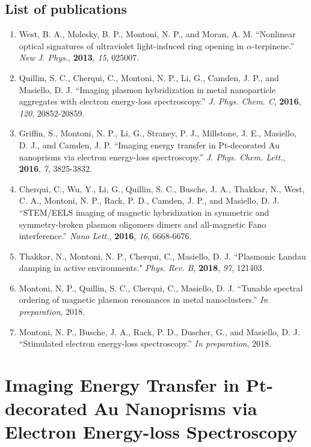 \documentclass [11pt, proquest] {uwthesis}[2016/11/22]
\begin{document}
\section{List of publications}
\begin{enumerate}
\item West, B. A., Molesky, B. P., Montoni, N. P., and Moran, A. M. ``Nonlinear optical signatures of ultraviolet light-induced ring opening in $\alpha$-terpinene.'' {\it New J. Phys.}, {\bf 2013}, {\it 15}, 025007.
\item Quillin, S. C., Cherqui, C., Montoni, N. P., Li, G., Camden, J. P., and Masiello, D. J. ``Imaging plasmon hybridization in metal nanoparticle aggregates with electron energy-loss spectroscopy.'' {\it J. Phys. Chem. C}, {\bf 2016}, {\it 120}, 20852-20859.
\item Griffin, S., Montoni, N. P., Li, G., Straney, P. J., Millstone, J. E., Masiello, D. J., and Camden, J. P. ``Imaging energy transfer in Pt-decorated Au nanoprisms via electron energy-loss spectroscopy.'' {\it J. Phys. Chem. Lett.}, {\bf 2016}, {\it 7}, 3825-3832.
\item Cherqui, C., Wu, Y., Li, G., Quillin, S. C., Busche, J. A., Thakkar, N., West, C. A., Montoni, N. P., Rack, P. D., Camden, J. P., and Masiello, D. J. ``STEM/EELS imaging of magnetic hybridization in symmetric and symmetry-broken plasmon oligomers dimers and all-magnetic Fano interference.'' {\it Nano Lett.}, {\bf 2016}, {\it 16}, 6668-6676. 
\item Thakkar, N., Montoni, N. P., Cherqui, C., Masiello, D. J. ``Plasmonic Landau damping in active environments." {\it Phys. Rev. B}, {\bf 2018}, {\it 97}, 121403.
\item Montoni, N. P., Quillin, S. C., Cherqui, C., Masiello, D. J. ``Tunable spectral ordering of magnetic plasmon resonances in metal nanoclusters.'' {\it In preparation}, 2018.
\item Montoni, N. P., Busche, J. A., Rack, P. D., Duscher, G., and Masiello, D. J. ``Stimulated electron energy-loss spectroscopy.'' {\it In preparation}, 2018.
\end{enumerate}
 
\chapter{Imaging Energy Transfer in Pt-decorated Au Nanoprisms via Electron Energy-loss Spectroscopy}
\end{document}
